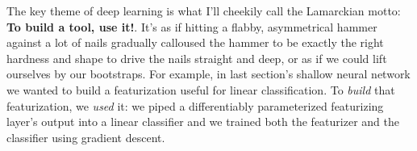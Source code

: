 \objectives{%
  \item
  \item
  \item
}

%
The key theme of deep learning is what I'll cheekily call the Lamarckian motto:
\textbf{To build a tool, use it!}.  It's as if hitting a flabby, asymmetrical
hammer against a lot of nails gradually calloused the hammer to be exactly the
right hardness and shape to drive the nails straight and deep, or as if we
could lift ourselves by our bootstraps.  For example, in last section's shallow
neural network we wanted to build a featurization useful for linear
classification.  To \emph{build} that featurization, we \emph{used} it: we
piped a differentiably parameterized featurizing layer's output into a linear
classifier and we trained both the featurizer and the classifier using gradient
descent.

